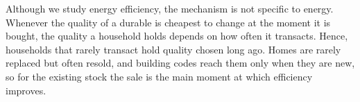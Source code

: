 Although we study energy efficiency, the mechanism is not specific to energy. Whenever the quality of a durable
is cheapest to change at the moment it is bought, the quality a household
holds depends on how often it transacts. Hence, households that rarely
transact hold quality chosen long ago. Homes are rarely replaced but often
resold, and building codes reach them only when they are new, so for the
existing stock the sale is the main moment at which efficiency improves.
